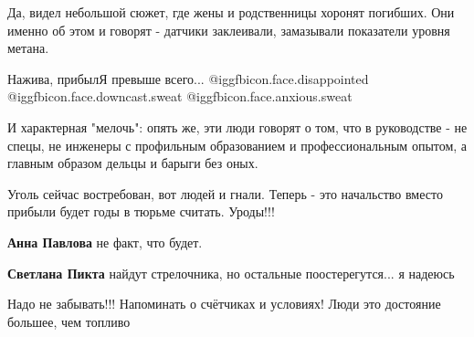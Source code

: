 \begin{itemize}

Да, видел небольшой сюжет, где жены и родственницы хоронят погибших. Они именно
об этом и говорят - датчики заклеивали, замазывали показатели уровня метана.

Нажива, прибылЯ превыше всего... @igg{fbicon.face.disappointed}  @igg{fbicon.face.downcast.sweat}  @igg{fbicon.face.anxious.sweat} 

И характерная "мелочь": опять же, эти люди говорят о том, что в руководстве -
не спецы, не инженеры с профильным образованием и профессиональным опытом, а
главным образом дельцы и барыги без оных.


Уголь сейчас востребован, вот людей и гнали. Теперь - это начальство вместо
прибыли будет годы в тюрьме считать. Уроды!!!

\begin{itemize} %
\textbf{Анна Павлова} не факт, что будет.

\textbf{Светлана Пикта} найдут стрелочника, но остальные поостерегутся... я надеюсь
\end{itemize} %

Надо не забывать!!!
Напоминать о счётчиках и условиях!
Люди это достояние большее, чем топливо

\end{itemize} %
